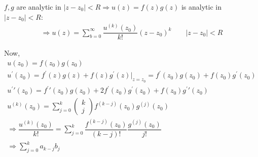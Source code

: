 \begin{prf}[]{}
  $f,g$ are analytic in $\left|z-z_0\right|<R\Rightarrow u(z) = f(z)g(z)$ is analytic in $\left|z-z_0\right|<R$:
  \begin{equation*}
    \begin{gathered}
      \Rightarrow u(z) = \sum_{b=0}^{\infty}\dfrac{u^{(k)}(z_0)}{k!}(z-z_0)^k\qquad\left|z-z_0\right|<R
    \end{gathered}
  \end{equation*}
  \par\bigskip
  \noindent Now, 
  \begin{equation*}
    \begin{gathered}
      u(z_0) = f(z_0)g(z_0)\\
      u^{\prime}(z_0) = f^{\prime}(z)g(z)+f(z)g^{\prime}(z)\Big|_{z = z_0} = f^{\prime}(z_0)g(z_0)+f(z_0)g^{\prime}(z_0)\\
      u^{\prime}\prime(z_0) = f^{\prime}\prime(z_0)g(z_0)+2f^{\prime}(z_0)g^{\prime}(z_0)+f(z_0)g^{\prime}\prime(z_0)\\
      u^{(k)}(z_0) = \sum_{j=0}^{k}\begin{pmatrix}k\\j\end{pmatrix}f^{(k-j)}(z_0)g^{(j)}(z_0)\\
      \Rightarrow \dfrac{u^{(k)}(z_0)}{k!} = \sum_{j=0}^{k}\dfrac{f^{(k-j)}(z_0)}{(k-j)!}\dfrac{g^{(j)}(z_0)}{j!}\\
      \Rightarrow \sum_{j=0}^{k}a_{k-j}b_j
    \end{gathered}
  \end{equation*}
\end{prf}

